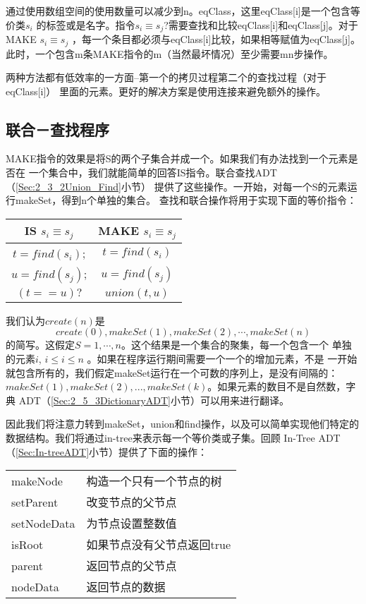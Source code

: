 通过使用数组空间的使用数量可以减少到n。eqClass，这里eqClass[i]是一个包含等价类$s_i$
的标签或是名字。指令$s_i \equiv s_j$?需要查找和比较eqClass[i]和eqClass[j]。对于
MAKE $s_i \equiv s_j$  ，每一个条目都必须与eqClass[i]比较，如果相等赋值为eqClass[j]。
此时，一个包含m条MAKE指令的m（当然最坏情况）至少需要mn步操作。

两种方法都有低效率的一方面--第一个的拷贝过程第二个的查找过程（对于eqClass[i]）
里面的元素。更好的解决方案是使用连接来避免额外的操作。

\subsection{联合－查找程序}\label{Sec:Union-Find}
MAKE指令的效果是将S的两个子集合并成一个。如果我们有办法找到一个元素是否在
一个集合中，我们就能简单的回答IS指令。联合查找ADT（\ref{Sec:2_3_2Union_Find}小节）
提供了这些操作。一开始，对每一个S的元素运行makeSet，得到n个单独的集合。
查找和联合操作将用于实现下面的等价指令：

\begin{tabular}{cc}
IS $s_i\equiv s_j$  &MAKE $s_i \equiv s_j$  \\
\hline
$t = find(s_i)$; & $t=find(s_i)$\\
$u = find(s_j)$; & $u=find(s_j)$\\
$(t==u)?$ & $union(t,u)$
\end{tabular}

我们认为$create(n)$是
\begin{displaymath}
create(0), makeSet(1), makeSet(2), \cdots, makeSet(n)
\end{displaymath}
的简写。这假定$S={1, \cdots, n}$。这个结果是一个集合的聚集，每一个包含一个
单独的元素$i$, $i\leq i\leq n$ 。如果在程序运行期间需要一个一个的增加元素，不是
一开始就包含所有的，我们假定makeSet运行在一个可数的序列上，是没有间隔的：
$makeSet(1), makeSet(2), ..., makeSet(k)$。如果元素的数目不是自然数，字典
ADT（\ref{Sec:2_5_3DictionaryADT}小节）可以用来进行翻译。

因此我们将注意力转到makeSet，union和find操作，以及可以简单实现他们特定的
数据结构。我们将通过in-tree来表示每一个等价类或子集。回顾
In-Tree ADT（\ref{Sec:In-treeADT}小节）提供了下面的操作：

\begin{tabular}{ll}
makeNode    &构造一个只有一个节点的树\\
setParent      & 改变节点的父节点\\
setNodeData &为节点设置整数值\\
isRoot      &如果节点没有父节点返回true\\
parent      &返回节点的父节点\\
nodeData        &返回节点的数据
\end{tabular}

